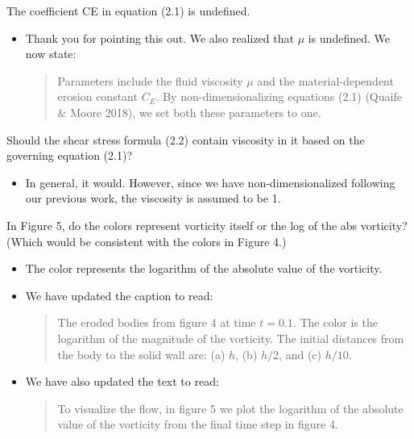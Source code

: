 \documentclass[11pt]{article}
\newcommand{\comment}[1]{{\color{blue} #1}}
\begin{document}
\noindent
\comment{The coefficient CE in equation (2.1) is undefined.}
\begin{itemize}
  \item Thank you for pointing this out. We also realized that $\mu$ is
  undefined. We now state:
  \begin{quotation}
    \noindent
    Parameters include the fluid viscosity $\mu$ and the
    material-dependent erosion constant $C_E$. By non-dimensionalizing
    equations (2.1) (Quaife \& Moore 2018), we set both these parameters
    to one.
  \end{quotation}
\end{itemize}

\noindent
\comment{Should the shear stress formula (2.2) contain viscosity in it
based on the governing equation (2.1)?}
\begin{itemize}
  \item In general, it would. However, since we have non-dimensionalized
    following our previous work, the viscosity is assumed to be 1.
\end{itemize}

\noindent
\comment{In Figure 5, do the colors represent vorticity itself or the
log of the abs vorticity? (Which would be consistent with the colors in
Figure 4.)}
\begin{itemize}
  \item The color represents the logarithm of the absolute value of the
    vorticity.
  \item We have updated the caption to read:
    \begin{quotation}
    \noindent
      The eroded bodies from figure 4 at time $t = 0.1$. The color is
      the logarithm of the magnitude of the vorticity. The initial
      distances from the body to the solid wall are: (a) $h$, (b) $h/2$,
      and (c) $h/10$.
    \end{quotation}
  \item We have also updated the text to read:
    \begin{quotation}
    \noindent
      To visualize the flow, in figure 5 we plot the logarithm of the
      absolute value of the vorticity from the final time step in figure
      4.
    \end{quotation}
\end{itemize}
\end{document}
